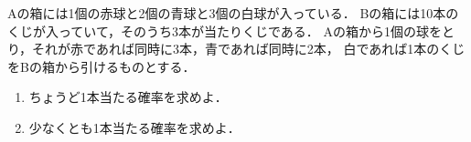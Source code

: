\documentclass[../../main.tex]{subfiles}
\begin{document}
Aの箱には1個の赤球と2個の青球と3個の白球が入っている．
Bの箱には10本のくじが入っていて，そのうち3本が当たりくじである．
Aの箱から1個の球をとり，それが赤であれば同時に3本，青であれば同時に2本，
白であれば1本のくじをBの箱から引けるものとする．
\begin{enumerate}
  \item ちょうど1本当たる確率を求めよ．
  \item 少なくとも1本当たる確率を求めよ．
\end{enumerate}
\end{document}
